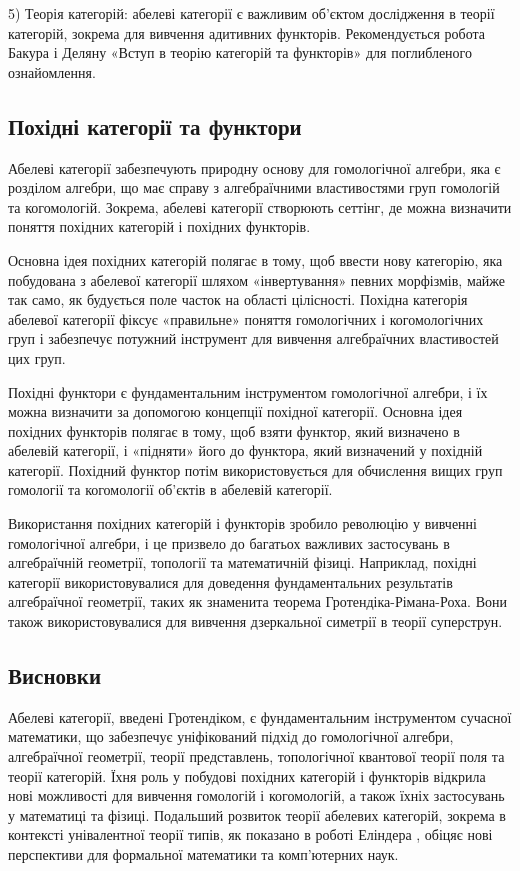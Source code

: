 \documentclass[12pt]{article}
\begin{document}
5) Теорія категорій: абелеві категорії є важливим об’єктом дослідження в теорії категорій, зокрема для вивчення адитивних функторів. Рекомендується робота Бакура і Деляну «Вступ в теорію категорій та функторів» \cite{BucurDelanu} для поглибленого ознайомлення.

\subsection{Похідні категорії та функтори}
Абелеві категорії забезпечують природну основу для гомологічної алгебри, яка є розділом алгебри, що має справу з алгебраїчними властивостями груп гомологій та когомологій. Зокрема, абелеві категорії створюють сеттінг, де можна визначити поняття похідних категорій і похідних функторів.

Основна ідея похідних категорій полягає в тому, щоб ввести нову категорію, яка побудована з абелевої категорії шляхом «інвертування» певних морфізмів, майже так само, як будується поле часток на області цілісності. Похідна категорія абелевої категорії фіксує «правильне» поняття гомологічних і когомологічних груп і забезпечує потужний інструмент для вивчення алгебраїчних властивостей цих груп.

Похідні функтори є фундаментальним інструментом гомологічної алгебри, і їх можна визначити за допомогою концепції похідної категорії. Основна ідея похідних функторів полягає в тому, щоб взяти функтор, який визначено в абелевій категорії, і «підняти» його до функтора, який визначений у похідній категорії. Похідний функтор потім використовується для обчислення вищих груп гомології та когомології об’єктів в абелевій категорії.

Використання похідних категорій і функторів зробило революцію у вивченні гомологічної алгебри, і це призвело до багатьох важливих застосувань в алгебраїчній геометрії, топології та математичній фізиці. Наприклад, похідні категорії використовувалися для доведення фундаментальних результатів алгебраїчної геометрії, таких як знаменита теорема Гротендіка-Рімана-Роха. Вони також використовувалися для вивчення дзеркальної симетрії в теорії суперструн.

\subsection{Висновки}
Абелеві категорії, введені Гротендіком, є фундаментальним інструментом сучасної математики, що забезпечує уніфікований підхід до гомологічної алгебри, алгебраїчної геометрії, теорії представлень, топологічної квантової теорії поля та теорії категорій. Їхня роль у побудові похідних категорій і функторів відкрила нові можливості для вивчення гомологій і когомологій, а також їхніх застосувань у математиці та фізиці. Подальший розвиток теорії абелевих категорій, зокрема в контексті унівалентної теорії типів, як показано в роботі Еліндера \cite{Elinder21}, обіцяє нові перспективи для формальної математики та комп’ютерних наук.
\end{document}

